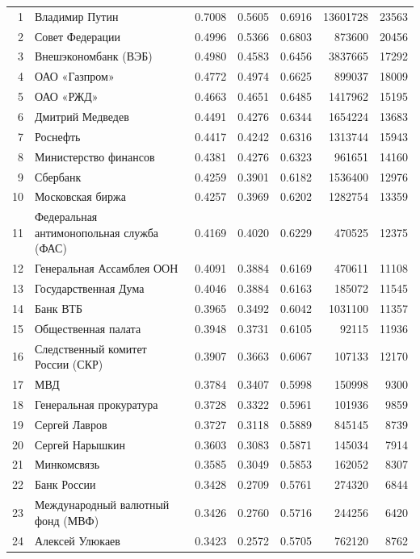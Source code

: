 {\begin{longtable}{r >{\raggedright\arraybackslash}p{4.2cm} S[table-format=1.4] S[table-format=1.4] S[table-format=1.4] r r}
1 & Владимир Путин & 0.7008 & 0.5605 & 0.6916 & 13601728 & 23563 \\
2 & Совет Федерации & 0.4996 & 0.5366 & 0.6803 & 873600 & 20456 \\
3 & Внешэкономбанк (ВЭБ) & 0.4980 & 0.4583 & 0.6456 & 3837665 & 17292 \\
4 & ОАО «Газпром» & 0.4772 & 0.4974 & 0.6625 & 899037 & 18009 \\
5 & ОАО «РЖД» & 0.4663 & 0.4651 & 0.6485 & 1417962 & 15195 \\
6 & Дмитрий Медведев & 0.4491 & 0.4276 & 0.6344 & 1654224 & 13683 \\
7 & Роснефть & 0.4417 & 0.4242 & 0.6316 & 1313744 & 15943 \\
8 & Министерство финансов & 0.4381 & 0.4276 & 0.6323 & 961651 & 14160 \\
9 & Сбербанк & 0.4259 & 0.3901 & 0.6182 & 1536400 & 12976 \\
10 & Московская биржа & 0.4257 & 0.3969 & 0.6202 & 1282754 & 13359 \\
11 & Федеральная антимонопольная служба (ФАС) & 0.4169 & 0.4020 & 0.6229 & 470525 & 12375 \\
12 & Генеральная Ассамблея ООН & 0.4091 & 0.3884 & 0.6169 & 470611 & 11108 \\
13 & Государственная Дума & 0.4046 & 0.3884 & 0.6163 & 185072 & 11545 \\
14 & Банк ВТБ & 0.3965 & 0.3492 & 0.6042 & 1031100 & 11357 \\
15 & Общественная палата & 0.3948 & 0.3731 & 0.6105 & 92115 & 11936 \\
16 & Следственный комитет России (СКР) & 0.3907 & 0.3663 & 0.6067 & 107133 & 12170 \\
17 & МВД & 0.3784 & 0.3407 & 0.5998 & 150998 & 9300 \\
18 & Генеральная прокуратура & 0.3728 & 0.3322 & 0.5961 & 101936 & 9859 \\
19 & Сергей Лавров & 0.3727 & 0.3118 & 0.5889 & 845145 & 8739 \\
20 & Сергей Нарышкин & 0.3603 & 0.3083 & 0.5871 & 145034 & 7914 \\
21 & Минкомсвязь & 0.3585 & 0.3049 & 0.5853 & 162052 & 8307 \\
22 & Банк России & 0.3428 & 0.2709 & 0.5761 & 274320 & 6844 \\
23 & Международный валютный фонд (МВФ) & 0.3426 & 0.2760 & 0.5716 & 244256 & 6420 \\
24 & Алексей Улюкаев & 0.3423 & 0.2572 & 0.5705 & 762120 & 8762 \\

\end{longtable}}
